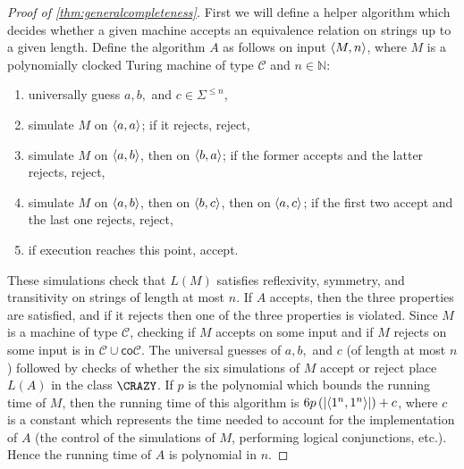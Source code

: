 \begin{proof}[Proof of \autoref{thm:generalcompleteness}]
  First we will define a helper algorithm which decides whether a given machine accepts an equivalence relation on strings up to a given length.
  Define the algorithm $A$ as follows on input $\langle M,n\rangle$, where $M$ is a polynomially clocked Turing machine of type $\mathcal{C}$ and $n\in\mathbb{N}$:
  \begin{enumerate}
  \item universally guess $a,b,$ and $c\in\Sigma^{\leq n}$,
  \item simulate $M$ on $\langle a,a\rangle$; if it rejects, reject,
  \item simulate $M$ on $\langle a,b\rangle$, then on $\langle b,a\rangle$; if the former accepts and the latter rejects, reject,
  \item simulate $M$ on $\langle a,b\rangle$, then on $\langle b,c\rangle$, then on $\langle a,c\rangle$; if the first two accept and the last one rejects, reject,
  \item if execution reaches this point, accept.
  \end{enumerate}
  These simulations check that $L(M)$ satisfies reflexivity, symmetry, and transitivity on strings of length at most $n$.
  If $A$ accepts, then the three properties are satisfied, and if it rejects then one of the three properties is violated.
  Since $M$ is a machine of type $\mathcal{C}$, checking if $M$ accepts on some input and if $M$ rejects on some input is in $\mathcal{C}\cup\mathsf{co}\mathcal{C}$.
  The universal guesses of $a,b,$ and $c$ (of length at most $n$) followed by checks of whether the six simulations of $M$ accept or reject place $L(A)$ in the class $\CRAZY$.
  If $p$ is the polynomial which bounds the running time of $M$, then the running time of this algorithm is $6p\left(\left|\langle1^n,1^n\rangle\right|\right)+c$, where $c$ is a constant which represents the time needed to account for the implementation of $A$ (the control of the simulations of $M$, performing logical conjunctions, etc.).
  Hence the running time of $A$ is polynomial in $n$.


\end{proof}
